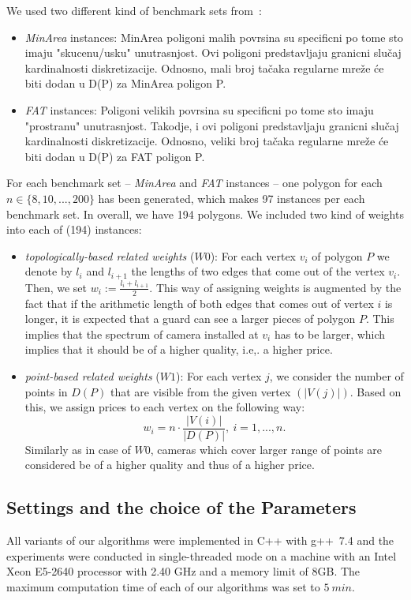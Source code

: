 \documentclass[runningheads,a4paper]{elsarticle}
\begin{document}
 We used two different kind of benchmark sets from~\cite{tomas2006visibility}:
     \begin{itemize}
     	 \item \emph{MinArea} instances: MinArea poligoni malih povrsina su specificni po tome sto imaju "skucenu/usku" unutrasnjost. Ovi poligoni predstavljaju granicni slučaj kardinalnosti diskretizacije. Odnosno, mali broj tačaka regularne mreže će biti dodan u D(P) za MinArea poligon P.
     	 \item \emph{FAT} instances:  Poligoni velikih povrsina su specificni po tome sto imaju "prostranu" unutrasnjost. Takodje, i ovi poligoni predstavljaju granicni slučaj kardinalnosti diskretizacije. Odnosno, veliki broj tačaka regularne mreže će biti dodan u D(P) za FAT poligon P.
     \end{itemize}
     For each benchmark set -- \emph{MinArea} and \emph{FAT} instances -- one polygon for each $n \in\{8,10,...,200\}$ has been generated, which makes 97 instances per each benchmark set. In overall, we have 194 polygons.
	We included two kind of weights into each of (194) instances:
	\begin{itemize}
		\item \emph{topologically-based related weights} ($W0$): For each vertex $v_i$ of polygon $P$ we denote by $l_i$ and $l_{i+1}$ the lengths of two edges that come out of the vertex $v_i$. Then, we set $w_i := \frac{l_i + l_{i+1}}{2}$. This way of assigning weights is augmented by the fact that if the arithmetic length of both edges that comes out of vertex $i$ is longer, it is expected that a guard can see a larger pieces of polygon $P$. This implies that the spectrum of camera installed at $v_i$ has to be larger, which implies that it should be of a higher quality, i.e,. a higher price.
		\item \emph{point-based related weights} ($W1$): For each vertex $j$, we consider the number of points in $D(P)$ that are visible from the given vertex $(|V(j)|)$. Based on this, we assign prices to each vertex on the following way:
		\begin{equation}
		w_i = n \cdot \frac{|V(i)|}{|D(P)|},\ i=1,...,n.
		\end{equation}
    Similarly as in case of $W0$, cameras which cover larger range of points are considered be of a higher quality and thus of a higher price.
	\end{itemize}

     \subsection{Settings and the choice of the Parameters}
      All variants of our algorithms were implemented in C++ with g++~7.4 and the experiments were conducted in single-threaded mode on a machine with an Intel Xeon E5-2640 processor with 2.40 GHz and a memory limit of 8GB. The maximum computation time of each of our algorithms was set to $5\ min$.
\end{document}

